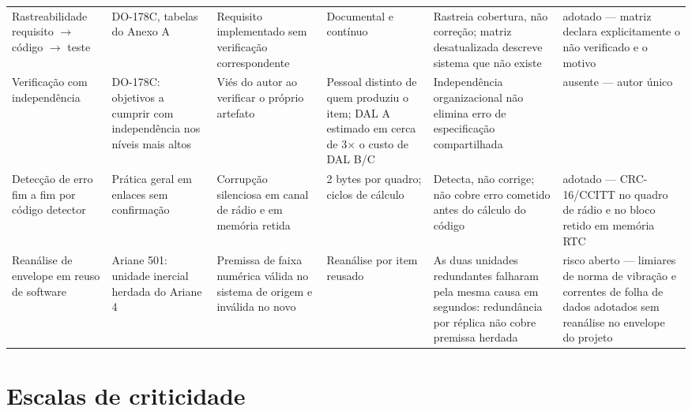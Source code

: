 \documentclass[10pt,a4paper,landscape]{article}
\begin{document}
\begin{table}[!p]
\begin{tabularx}{\textwidth}{@{}Y{0.80}Y{0.80}Y{1.10}Y{0.82}Y{1.26}Y{1.22}@{}}
Rastreabilidade requisito $\rightarrow$ código $\rightarrow$ teste &
DO-178C, tabelas do Anexo A~\cite{do178c} &
Requisito implementado sem verificação correspondente &
Documental e contínuo &
Rastreia cobertura, não correção; matriz desatualizada descreve sistema que não existe &
\textsf{adotado} --- matriz declara explicitamente o não verificado e o motivo \\

Verificação com independência &
DO-178C: objetivos a cumprir com independência nos níveis mais altos~\cite{do178c} &
Viés do autor ao verificar o próprio artefato &
Pessoal distinto de quem produziu o item; DAL A estimado em cerca de 3$\times$ o custo de DAL B/C &
Independência organizacional não elimina erro de especificação compartilhada &
\textsf{ausente} --- autor único \\

Detecção de erro fim a fim por código detector &
Prática geral em enlaces sem confirmação &
Corrupção silenciosa em canal de rádio e em memória retida &
2 bytes por quadro; ciclos de cálculo &
Detecta, não corrige; não cobre erro cometido antes do cálculo do código &
\textsf{adotado} --- CRC-16/CCITT no quadro de rádio e no bloco retido em memória RTC \\

Reanálise de envelope em reuso de software &
Ariane 501: unidade inercial herdada do Ariane 4~\cite{esa1996} &
Premissa de faixa numérica válida no sistema de origem e inválida no novo &
Reanálise por item reusado &
As duas unidades redundantes falharam pela mesma causa em segundos: redundância por réplica não cobre premissa herdada &
\textsf{risco aberto} --- limiares de norma de vibração e correntes de folha de dados adotados sem reanálise no envelope do projeto \\

\bottomrule
\end{tabularx}
\end{table}


\section{Escalas de criticidade}
\end{document}
